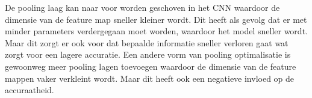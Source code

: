 De pooling laag kan naar voor worden geschoven in het CNN waardoor de dimensie van de feature map sneller kleiner wordt.
Dit heeft als gevolg dat er met minder parameters verdergegaan moet worden, waardoor het model sneller wordt.
Maar dit zorgt er ook voor dat bepaalde informatie sneller verloren gaat wat zorgt voor een lagere accuratie.
Een andere vorm van pooling optimalisatie is gewoonweg meer pooling lagen toevoegen waardoor de dimensie van de feature mappen vaker verkleint wordt.
Maar dit heeft ook een negatieve invloed op de accuraatheid.
